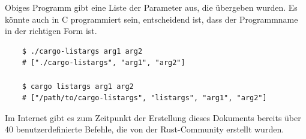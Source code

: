 Obiges Programm gibt eine Liste der Parameter aus, die übergeben wurden. Es könnte auch in C programmiert sein, entscheidend ist, dass der Programmname in der richtigen Form ist.

\begin{lstlisting}
    $ ./cargo-listargs arg1 arg2
    # ["./cargo-listargs", "arg1", "arg2"]

    $ cargo listargs arg1 arg2
    # ["/path/to/cargo-listargs", "listargs", "arg1", "arg2"]
\end{lstlisting}

Im Internet gibt es zum Zeitpunkt der Erstellung dieses Dokuments bereits über 40 benutzerdefinierte Befehle, die von der Rust-Community erstellt wurden. \cite{CargoSubcommands}
